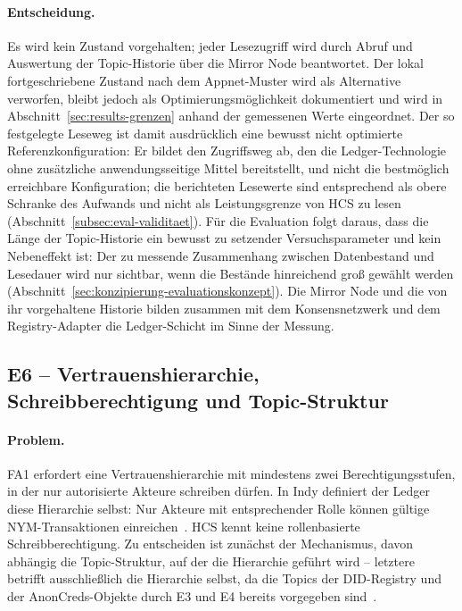 \paragraph{Entscheidung.}
Es wird kein Zustand vorgehalten; jeder Lesezugriff wird durch Abruf und Auswertung der Topic-Historie über die Mirror Node beantwortet. Der lokal fortgeschriebene Zustand nach dem Appnet-Muster wird als Alternative verworfen, bleibt jedoch als Optimierungsmöglichkeit dokumentiert und wird in Abschnitt~\ref{sec:results-grenzen} anhand der gemessenen Werte eingeordnet. Der so festgelegte Leseweg ist damit ausdrücklich eine bewusst nicht optimierte Referenzkonfiguration: Er bildet den Zugriffsweg ab, den die Ledger-Technologie ohne zusätzliche anwendungsseitige Mittel bereitstellt, und nicht die bestmöglich erreichbare Konfiguration; die berichteten Lesewerte sind entsprechend als obere Schranke des Aufwands und nicht als Leistungsgrenze von HCS zu lesen (Abschnitt~\ref{subsec:eval-validitaet}). Für die Evaluation folgt daraus, dass die Länge der Topic-Historie ein bewusst zu setzender Versuchsparameter und kein Nebeneffekt ist: Der zu messende Zusammenhang zwischen Datenbestand und Lesedauer wird nur sichtbar, wenn die Bestände hinreichend groß gewählt werden (Abschnitt~\ref{sec:konzipierung-evaluationskonzept}). Die Mirror Node und die von ihr vorgehaltene Historie bilden zusammen mit dem Konsensnetzwerk und dem Registry-Adapter die Ledger-Schicht im Sinne der Messung.


\subsection{E6 -- Vertrauenshierarchie, Schreibberechtigung und Topic-Struktur}
\label{subsec:e6-vertrauenshierarchie}

\paragraph{Problem.}
FA1 erfordert eine Vertrauenshierarchie mit mindestens zwei Berechtigungsstufen, in der nur autorisierte Akteure schreiben dürfen. In Indy definiert der Ledger diese Hierarchie selbst: Nur Akteure mit entsprechender Rolle können gültige NYM-Transaktionen einreichen~\cite{torongo2023}. HCS kennt keine rollenbasierte Schreibberechtigung. Zu entscheiden ist zunächst der Mechanismus, davon abhängig die Topic-Struktur, auf der die Hierarchie geführt wird -- letztere betrifft ausschließlich die Hierarchie selbst, da die Topics der DID-Registry und der AnonCreds-Objekte durch E3 und E4 bereits vorgegeben sind~\cite{hasheddidmethod,hieroanoncreds}.

